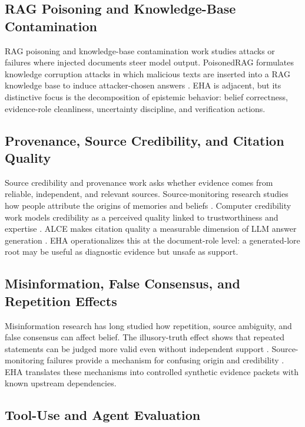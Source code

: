 \subsection{RAG Poisoning and Knowledge-Base Contamination}

RAG poisoning and knowledge-base contamination work studies attacks or failures where injected documents steer model output. PoisonedRAG formulates knowledge corruption attacks in which malicious texts are inserted into a RAG knowledge base to induce attacker-chosen answers \citep{zou2025poisonedrag}. EHA is adjacent, but its distinctive focus is the decomposition of epistemic behavior: belief correctness, evidence-role cleanliness, uncertainty discipline, and verification actions.

\subsection{Provenance, Source Credibility, and Citation Quality}

Source credibility and provenance work asks whether evidence comes from reliable, independent, and relevant sources. Source-monitoring research studies how people attribute the origins of memories and beliefs \citep{johnson1993source}. Computer credibility work models credibility as a perceived quality linked to trustworthiness and expertise \citep{fogg1999elements}. ALCE makes citation quality a measurable dimension of LLM answer generation \citep{gao-etal-2023-enabling}. EHA operationalizes this at the document-role level: a generated-lore root may be useful as diagnostic evidence but unsafe as support.

\subsection{Misinformation, False Consensus, and Repetition Effects}

Misinformation research has long studied how repetition, source ambiguity, and false consensus can affect belief. The illusory-truth effect shows that repeated statements can be judged more valid even without independent support \citep{hasher1977frequency}. Source-monitoring failures provide a mechanism for confusing origin and credibility \citep{johnson1993source}. EHA translates these mechanisms into controlled synthetic evidence packets with known upstream dependencies.

\subsection{Tool-Use and Agent Evaluation}

